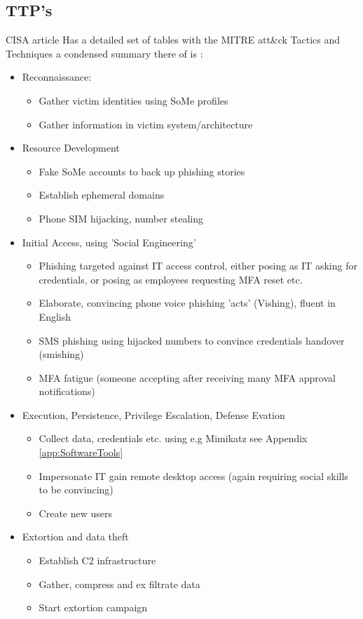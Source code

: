 \documentclass[
	letterpaper, %
	10pt, %
	unnumberedsections, %
	twoside, %
]{APAAssignment}
\begin{document}
\subsection{TTP's}
CISA article \cite{CISA_ScattetedSpider} Has a detailed set of tables with the MITRE att\&ck Tactics and Techniques a condensed summary there of is :
\begin{itemize}
	\item Reconnaissance:
	      \begin{itemize}
		      \item Gather victim identities using SoMe profiles
		      \item Gather information in victim system/architecture
	      \end{itemize}
	\item Resource Development
	      \begin{itemize}
		      \item Fake SoMe accounts to back up phishing stories
		      \item Establish ephemeral domains
		      \item Phone SIM hijacking, number stealing
	      \end{itemize}
	\item Initial Access, using 'Social Engineering'
	      \begin{itemize}
		      \item Phishing targeted against IT access control, either posing as IT asking for credentials, or posing as employees requesting MFA reset etc.
		      \item Elaborate, convincing phone voice phishing 'acts' (Vishing), fluent in English
		      \item SMS phishing using hijacked numbers to convince credentials handover (smishing)
		      \item MFA fatigue (someone accepting after receiving many MFA approval notifications)
	      \end{itemize}
	\item Execution, Persistence, Privilege Escalation, Defense Evation
	      \begin{itemize}
		      \item Collect data, credentials etc. using e.g Mimikatz see Appendix \ref{app:SoftwareTools}
		      \item Impersonate IT gain remote desktop access (again requiring social skills to be convincing)
		      \item Create new users
	      \end{itemize}
	\item Extortion and data theft
	      \begin{itemize}
		      \item Establish C2 infrastructure
		      \item Gather, compress and ex filtrate data
		      \item Start extortion campaign
	      \end{itemize}
\end{itemize}
\end{document}
